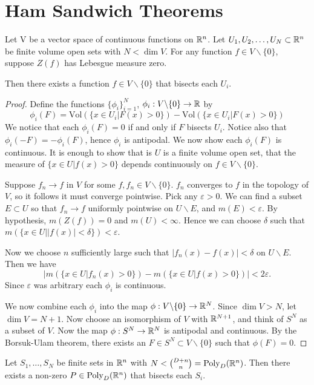 \section{Ham Sandwich Theorems}
\begin{theorem}
Let V be a vector space of continuous functions on $\mathbb R^n$. Let $U_1,U_2,\dots,U_N \subset \mathbb R^n$ be finite volume open sets with $N< \dim V$. For any function $f \in V\backslash \{0\}$, suppose $Z(f)$ has Lebesgue measure zero.

Then there exists a function $f \in V\backslash \{0\}$ that bisects each $U_i$. \label{thm:GenHamSand}
\end{theorem}
\begin{proof}
Define the functions $\{\phi_i\}_{i=1}^N$, $\phi_i: V\backslash \{0\} \to \mathbb R$ by
\[
\phi_i(F) = \text{Vol}(\{x\in U_i | F(x) > 0 \}) - \text{Vol}(\{x\in U_i | F(x) > 0 \})
\]
We notice that each $\phi_i(F) = 0$ if and only if $F$ bisects $U_i$. Notice also that $\phi_i(-F) = -\phi_i(F)$, hence $\phi_i$ is antipodal. We now show each $\phi_i(F)$ is continuous.
It is enough to show that is $U$ is a finite volume open set, that the measure of $\{x\in U| f(x)>0\}$ depends continuously on $f\in V \backslash \{0\}$.

Suppose $f_n \to f$ in $V$ for some $f,f_n \in V \backslash \{0\}$. $f_n$ converges to $f$ in the topology of $V$, so it follows it must converge pointwise. Pick any $\varepsilon >0$. We can find a subset $E\subset U$ so that $f_n \to f$ uniformly pointwise on $U \backslash E$, and $m(E)< \varepsilon$.
By hypothesis, $m(Z(f)) =0$ and $m(U) < \infty$. Hence we can choose $\delta$ such that $m\left(\{x\in U| |f(x)|<\delta\}\right) < \varepsilon$.

Now we choose $n$ sufficiently large such that $|f_n (x) - f(x)| < \delta$ on $U\backslash E$. Then we have \[|m\left(\{x\in U| f_n(x)>0\}\right) - m\left(\{x\in U| f(x)>0\}\right)| < 2 \varepsilon.\] Since $\varepsilon$ was arbitrary each $\phi_i$ is continuous.

We now combine each $\phi_i$ into the map $\phi : V\backslash \{0\} \to \mathbb R^N$. Since $\dim V > N$, let $\dim V = N+1$. Now choose an isomorphism of $V$ with $\mathbb R^{N+1}$, and think of $S^N$ as a subset of $V$.
Now the map $\phi: S^N \to \mathbb R^N$ is antipodal and continuous. By the Borsuk-Ulam theorem, there exists an $F\in S^N \subset V\backslash \{0\}$ such that $\phi(F) = 0$.
\end{proof}

\begin{corollary}
    Let $S_1, \dots , S_N$ be finite sets in $\mathbb R^n$ with $N < {{D+n}\choose{n}} = \text{Poly}_D (\mathbb R^n)$. Then there exists a non-zero $P\in \text{Poly}_D (\mathbb R^n)$ that bisects each $S_i$.  \label{thm:FiniteHamSandwich} 
\end{corollary}

